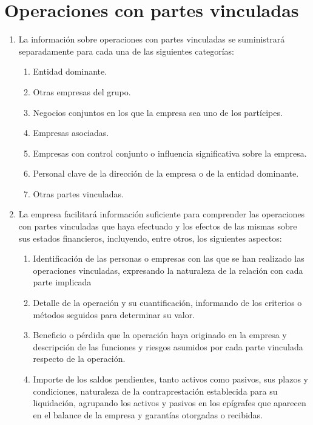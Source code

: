 \documentclass[11pt,a4paper]{article}
\begin{document}
\section{Operaciones con partes vinculadas}
\begin{enumerate}
 \item La información sobre operaciones con partes vinculadas se suministrará separadamente para cada una de las siguientes categorías:
  \begin{enumerate}
   \item Entidad dominante.
   \item Otras empresas del grupo.
   \item Negocios conjuntos en los que la empresa sea uno de los partícipes.
   \item Empresas asociadas.
   \item Empresas con control conjunto o influencia significativa sobre la empresa.
   \item Personal clave de la dirección de la empresa o de la entidad dominante.
   \item Otras partes vinculadas.
  \end{enumerate}
 \item La empresa facilitará información suficiente para comprender las operaciones con partes vinculadas que haya efectuado y los efectos de las mismas sobre sus estados financieros, incluyendo, entre otros, los siguientes aspectos:
   \begin{enumerate}
     \item Identificación de las personas o empresas con las que se han realizado las operaciones vinculadas, expresando la naturaleza de la relación con cada parte implicada

     \item Detalle de la operación y su cuantificación, informando de los criterios o métodos seguidos para determinar su valor.

     \item Beneficio o pérdida que la operación haya originado en la empresa y descripción de las funciones y riesgos asumidos por cada parte vinculada respecto de la operación.

     \item Importe de los saldos pendientes, tanto activos como pasivos, sus plazos y condiciones, naturaleza de la contraprestación establecida para su liquidación, agrupando los activos y pasivos en los epígrafes que aparecen en el balance de la empresa y garantías otorgadas o recibidas.


\end{enumerate}
\end{enumerate}
\end{document}
